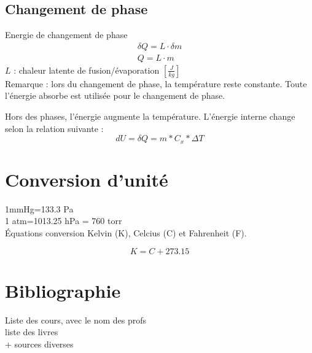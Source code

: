 \documentclass[12pt,a4paper,twoside]{article}
\numberwithin{equation}{subsection}
\begin{document}
\subsection{Changement de phase}
Energie de changement de phase
\begin{eqnarray}
\delta Q=L \cdot \delta m\\
Q=L \cdot m
\end{eqnarray}
$L$ : chaleur latente de fusion/évaporation $[\frac{J}{kg}]$\\
Remarque : lors du changement de phase, la température reste constante. Toute l'énergie absorbe est utilisée pour le changement de phase.

Hors des phases, l'énergie augmente la température. L'énergie interne change selon la relation suivante : 
\begin{equation}
dU=\delta Q=m*C_x*\Delta T
\end{equation}




\newpage
\section{Conversion d'unité}

1mmHg=133.3 Pa\\
1 atm=1013.25 hPa = 760 torr\\

Équations conversion Kelvin (K), Celcius (C) et Fahrenheit (F).

\begin{equation}
K=C+273.15
\end{equation}


\newpage
\section{Bibliographie}
Liste des cours, avec le nom des profs\\
liste des livres\\
+ sources diverses
\end{document}

